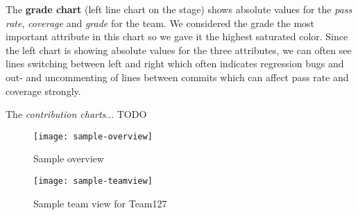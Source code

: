\documentclass[../manifest.tex]{subfiles}
\begin{document}
The \textbf{grade chart} (left line chart on the stage) shows absolute values for the \textit{pass rate}, \textit{coverage} and \textit{grade} for the team. We considered the grade the most important attribute in this chart so we gave it the highest saturated color. Since the left chart is showing absolute values for the three attributes, we can often see lines switching between left and right which often indicates regression bugs and out- and uncommenting of lines between commits which can affect pass rate and coverage strongly.

The \textit{contribution charts}... TODO

\begin{figure}[h]
  \centering
  \texttt{[image: sample-overview]}
  \caption{Sample overview}
  \label{fig:sample-overview}
\end{figure}

\begin{figure}[h]
  \centering
  \texttt{[image: sample-teamview]}
  \caption{Sample team view for Team127}
  \label{fig:sample-teamview}
\end{figure}






\end{document}
